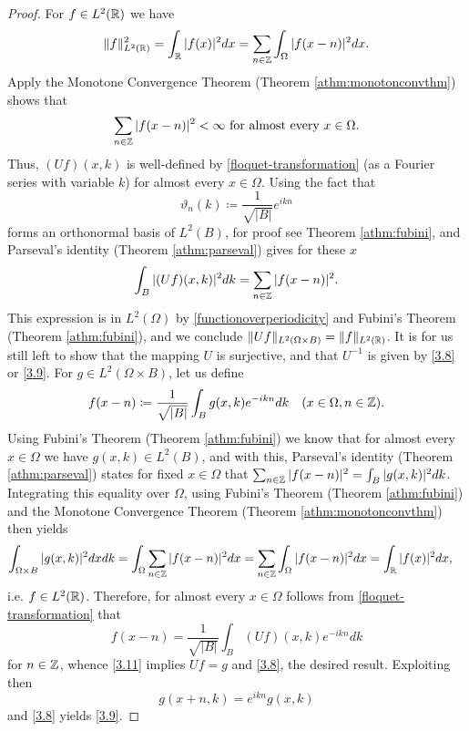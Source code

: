 \begin{theorem}
	\begin{proof}
		For $f \in L^{2}(\mathbb{R})$ we have
		\begin{equation}
			\| f \|_{L^{2}(\mathbb{R})}^{2} = \int_{\mathbb{R}} |f(x)|^{2} dx = \sum_{n \in \mathbb{Z}} \int_{\Omega} |f(x - n)|^{2} dx.\label{functionoverperiodicity}
		\end{equation} 
		Apply the Monotone Convergence Theorem (Theorem \ref{athm:monotonconvthm}) shows that
		\[ \sum_{n \in \mathbb{Z}} |f(x - n)|^{2} < \infty \text{ for almost every } x \in \Omega.\]
		Thus, $(Uf)(x, k)$ is well-defined by \eqref{floquet-transformation} (as a Fourier series with variable $k$) for almost every $x \in \Omega$. Using the fact that 
		\[ \vartheta_{n}(k) \coloneqq \frac{1}{\sqrt{|B|}} e^{ikn} \]
		forms an orthonormal basis of $L^{2}(B)$, for proof see Theorem \ref{athm:fubini}, and Parseval's identity (Theorem \ref{athm:parseval}) gives for these $x$
		\[ \int_{B}|(Uf)(x,k)|^{2} dk = \sum_{n \in \mathbb{Z}} |f(x - n)|^{2}. \]
	 	This expression is in $L^{2}(\Omega)$ by \eqref{functionoverperiodicity} and Fubini's Theorem (Theorem \ref{athm:fubini}), and we conclude $\| Uf \|_{L^{2}(\Omega \times B)} = \|f\|_{L^{2}(\mathbb{R})}$. It is for us still left to show that the mapping $U$ is surjective, and that $U^{-1}$ is given by \eqref{3.8} or \eqref{3.9}. For $g \in L^{2}(\Omega \times B)$, let us define
		\begin{equation}
			f(x - n) \coloneqq \frac{1}{\sqrt{|B|}} \int_{B} g(x, k) e^{-ikn} dk \quad (x \in \Omega, n \in\mathbb{Z}).\label{3.11}
		\end{equation}
		Using Fubini's Theorem (Theorem \ref{athm:fubini}) we know that for almost every $x \in \Omega$ we have $g(x, k) \in L^{2}(B)$, and with this, Parseval's identity (Theorem \ref{athm:parseval}) states for fixed $x \in \Omega$ that $\sum_{n \in \mathbb{Z}} |f(x - n)|^{2} = \int_{B} |g(x, k)|^{2} dk$. Integrating this equality over $\Omega$, using Fubini's Theorem (Theorem \ref{athm:fubini}) and the Monotone Convergence Theorem (Theorem \ref{athm:monotonconvthm}) then yields
		\begin{align*}
			\int_{\Omega \times B} |g(x, k)|^{2} dx dk & = \int_{\Omega} \sum_{n \in \mathbb{Z}} |f(x - n)|^{2} dx  = \sum_{n \in\mathbb{Z}} \int_{\Omega} |f(x-n)|^{2} dx = \int_{\mathbb{R}} |f(x)|^{2} dx,	
		\end{align*}
		i.e. $f \in L^{2}(\mathbb{R})$. Therefore, for almost every $x \in \Omega$ follows from \eqref{floquet-transformation} that
		\[ f(x - n) = \frac{1}{\sqrt{|B|}} \int_{B} (Uf)(x,k) e^{-ikn} dk \]
		for $n \in \mathbb{Z}$, whence \eqref{3.11} implies $U f = g$ and \eqref{3.8}, the desired result. Exploiting then 
		\[ g(x + n, k) = e^{ikn} g(x, k) \]
		and \eqref{3.8} yields \eqref{3.9}.
	\end{proof}				
\end{theorem}


